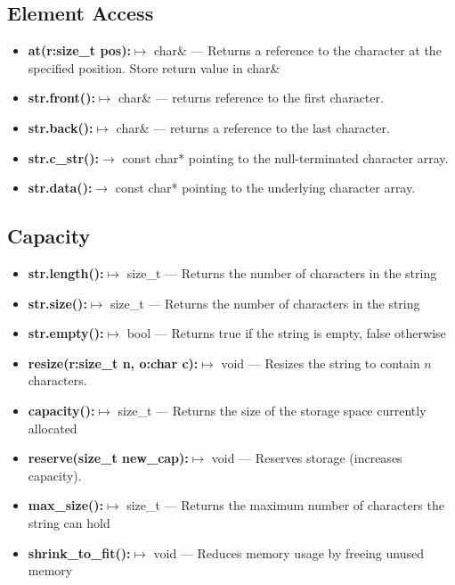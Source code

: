 \documentclass{report}
\begin{document}
    \bigbreak \noindent 
    \subsection{Element Access}
    \begin{itemize}
        \item \textbf{at(r:size\_t pos):}$\mapsto$ char\& --- Returns a reference to the character at the specified position. Store return value in char\&
        \item \textbf{str.front():}$\mapsto$ char\& --- returns reference to the first character. 
        \item \textbf{str.back():}$\mapsto$ char\& --- returns a reference to the last character. 
        \item \textbf{str.c\_str():}$\rightarrow$ const char* pointing to the null-terminated character array.
        \item \textbf{str.data():}$\to$ const char* pointing to the underlying character array.        
    \end{itemize}
    \bigbreak \noindent 
    \subsection{Capacity}
    \begin{itemize}
        \item \textbf{str.length():}$\mapsto$ size\_t --- Returns the number of characters in the string 
        \item \textbf{str.size():}$\mapsto$ size\_t --- Returns the number of characters in the string 
        \item \textbf{str.empty():}$\mapsto$ bool --- Returns true if the string is empty, false otherwise 
        \item \textbf{resize(r:size\_t n, o:char c):}$\mapsto$ void --- Resizes the string to contain $n$ characters.
        \item \textbf{capacity():}$\mapsto$ size\_t --- Returns the size of the storage space currently allocated 
        \item \textbf{reserve(size\_t new\_cap):}$\mapsto$ void --- Reserves storage (increases capacity).
        \item \textbf{max\_size():}$\mapsto$ size\_t --- Returns the maximum number of characters the string can hold 
        \item \textbf{shrink\_to\_fit():}$\mapsto$ void --- Reduces memory usage by freeing unused memory 
    \end{itemize}
    \bigbreak \noindent 
\end{document}

